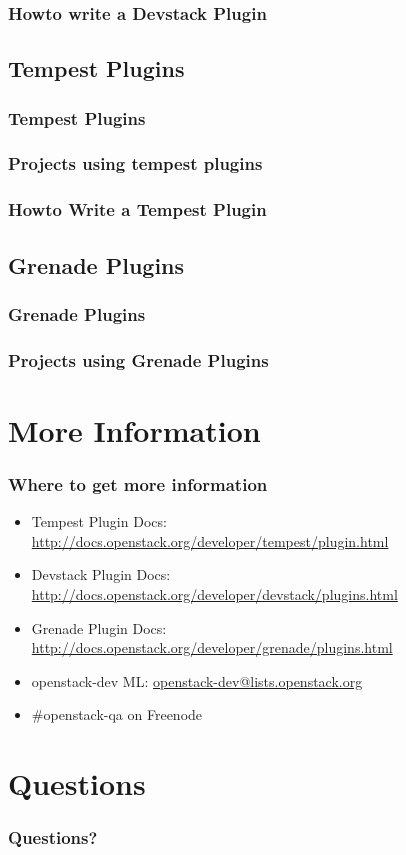 \documentclass[aspectratio=169,11pt,hyperref={colorlinks=true}]{beamer}
\begin{document}
\begin{frame}
    \frametitle{Howto write a Devstack Plugin}

\end{frame}

\subsection{Tempest Plugins}
\begin{frame}
    \frametitle{Tempest Plugins}
\end{frame}

\begin{frame}
    \frametitle{Projects using tempest plugins}

\end{frame}

\begin{frame}
    \frametitle{Howto Write a Tempest Plugin}

\end{frame}

\subsection{Grenade Plugins}
\begin{frame}
    \frametitle{Grenade Plugins}
\end{frame}

\begin{frame}
\frametitle{Projects using Grenade Plugins}

\end{frame}

\section{More Information}
\begin{frame}
\frametitle{Where to get more information}
    \begin{itemize}
        \item Tempest Plugin Docs: \href{http://docs.openstack.org/developer/tempest/plugin.html}{http://docs.openstack.org/developer/tempest/plugin.html}
        \item Devstack Plugin Docs: \href{http://docs.openstack.org/developer/devstack/plugins.html}{http://docs.openstack.org/developer/devstack/plugins.html}
        \item Grenade Plugin Docs: \href{http://docs.openstack.org/developer/grenade/plugins.html}{http://docs.openstack.org/developer/grenade/plugins.html}
        \item openstack-dev ML: \href{mailto:openstack-dev@lists.openstack.org}{openstack-dev@lists.openstack.org}
        \item \#openstack-qa on Freenode
    \end{itemize}
\end{frame}

\section{Questions}
\begin{frame}
\frametitle{Questions?}
\end{frame}

\end{document}
